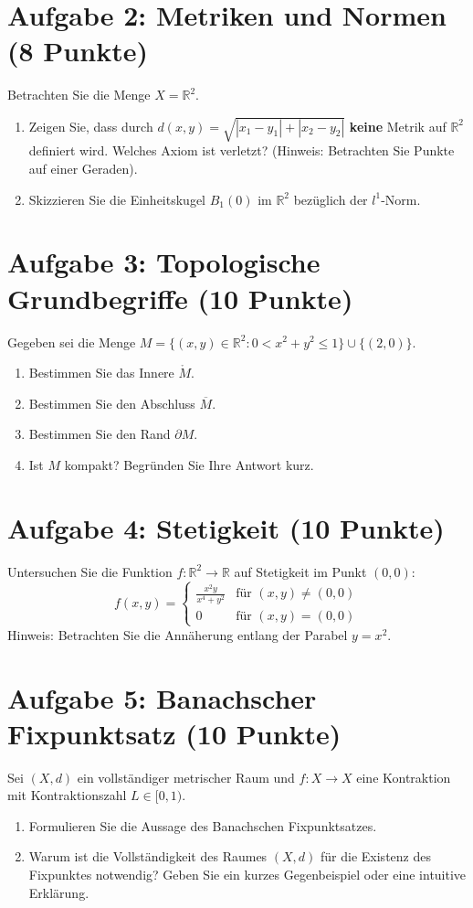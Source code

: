 \newpage

\section*{Aufgabe 2: Metriken und Normen (8 Punkte)}
Betrachten Sie die Menge $X = \mathbb{R}^2$. 
\begin{enumerate}
    \item Zeigen Sie, dass durch $d(x, y) = \sqrt{|x_1 - y_1| + |x_2 - y_2|}$ \textbf{keine} Metrik auf $\mathbb{R}^2$ definiert wird. Welches Axiom ist verletzt? (Hinweis: Betrachten Sie Punkte auf einer Geraden).
    \item Skizzieren Sie die Einheitskugel $B_1(0)$ im $\mathbb{R}^2$ bezüglich der $l^1$-Norm.
\end{enumerate}

\newpage

\section*{Aufgabe 3: Topologische Grundbegriffe (10 Punkte)}
Gegeben sei die Menge $M = \{(x, y) \in \mathbb{R}^2 : 0 < x^2 + y^2 \le 1\} \cup \{(2, 0)\}$.
\begin{enumerate}
    \item Bestimmen Sie das Innere $\mathring{M}$.
    \item Bestimmen Sie den Abschluss $\overline{M}$.
    \item Bestimmen Sie den Rand $\partial M$.
    \item Ist $M$ kompakt? Begründen Sie Ihre Antwort kurz.
\end{enumerate}

\newpage

\section*{Aufgabe 4: Stetigkeit (10 Punkte)}
Untersuchen Sie die Funktion $f: \mathbb{R}^2 \to \mathbb{R}$ auf Stetigkeit im Punkt $(0,0)$:
\[
f(x, y) = 
\begin{cases} 
\frac{x^2 y}{x^4 + y^2} & \text{für } (x, y) \neq (0,0) \\
0 & \text{für } (x, y) = (0,0)
\end{cases}
\]
Hinweis: Betrachten Sie die Annäherung entlang der Parabel $y = x^2$.

\newpage

\section*{Aufgabe 5: Banachscher Fixpunktsatz (10 Punkte)}
Sei $(X, d)$ ein vollständiger metrischer Raum und $f: X \to X$ eine Kontraktion mit Kontraktionszahl $L \in [0, 1)$.
\begin{enumerate}
    \item Formulieren Sie die Aussage des Banachschen Fixpunktsatzes.
    \item Warum ist die Vollständigkeit des Raumes $(X, d)$ für die Existenz des Fixpunktes notwendig? Geben Sie ein kurzes Gegenbeispiel oder eine intuitive Erklärung.
\end{enumerate}